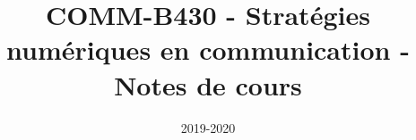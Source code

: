 
\setcounter{tocdepth}{1}
\graphicspath{{images/}}

\usepackage{tikz}
\usetikzlibrary{intersections}

\title{COMM-B430 - Stratégies numériques en communication - Notes de cours}
\date{2019-2020}



\maketitle
\tableofcontents
\newpage


\newpage

\newpage

\newpage

\newpage

\newpage

\newpage

\newpage

\newpage

\newpage



